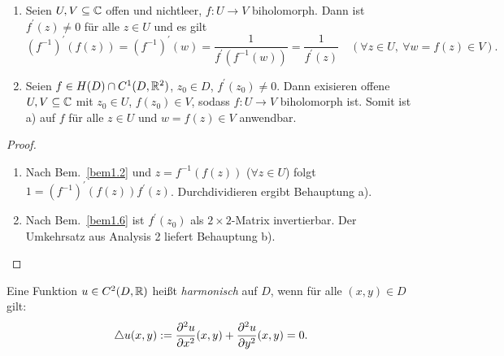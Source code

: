 \documentclass[a4paper,twoside,DIV15,BCOR12mm]{scrbook}
\begin{document}
\begin{satz} \label{satz1.8}
\begin{enumerate}
\item\label{satz1.8a} Seien $U, V \subseteq \mathbb{C}$ offen und nichtleer, $f\colon U \to V$ biholomorph. Dann ist $f^\prime(z)\neq 0$ für alle $z\in U$ und es gilt
\[(f^{-1})^\prime(f(z)) = (f^{-1})^\prime(w) = \frac{1}{f^\prime(f^{-1}(w))} = \frac{1}{f^\prime(z)} \quad (\forall z\in U,\ \forall w=f(z) \in V).\]
\item Seien $f\in H(D) \cap C^1(D, \mathbb{R}^2)$, $z_0\in D$, $f^\prime(z_0)\neq0$. Dann exisieren offene $U, V \subseteq \mathbb{C}$ mit $z_0\in U$, $f(z_0)\in V$, sodass $f\colon U \to V$ biholomorph ist. Somit ist a) auf $f$ für alle $z\in U$ und $w=f(z)\in V$ anwendbar.
\end{enumerate}
\end{satz}
\begin{proof}
\begin{enumerate}
\item Nach Bem.~\ref{bem1.2} und $z=f^{-1}(f(z))$ ($\forall z\in U$) folgt $1 = (f^{-1})^\prime(f(z))f^\prime(z)$. Durchdividieren ergibt Behauptung a).
\item Nach Bem.~\ref{bem1.6} ist $f^\prime(z_0)$ als $2\times2$-Matrix invertierbar. Der Umkehrsatz aus Analysis 2 liefert Behauptung b).\qedhere
\end{enumerate}
\end{proof}

\begin{dfn*} Eine Funktion $u\in C^2(D, \mathbb{R})$ heißt \emph{harmonisch} auf $D$, wenn für alle $(x, y) \in D$ gilt:
\[\triangle u(x, y) := \frac{\partial^2u}{\partial x^2}(x, y) + \frac{\partial^2u}{\partial y^2}(x, y) = 0.\]
\end{dfn*}
\end{document}
